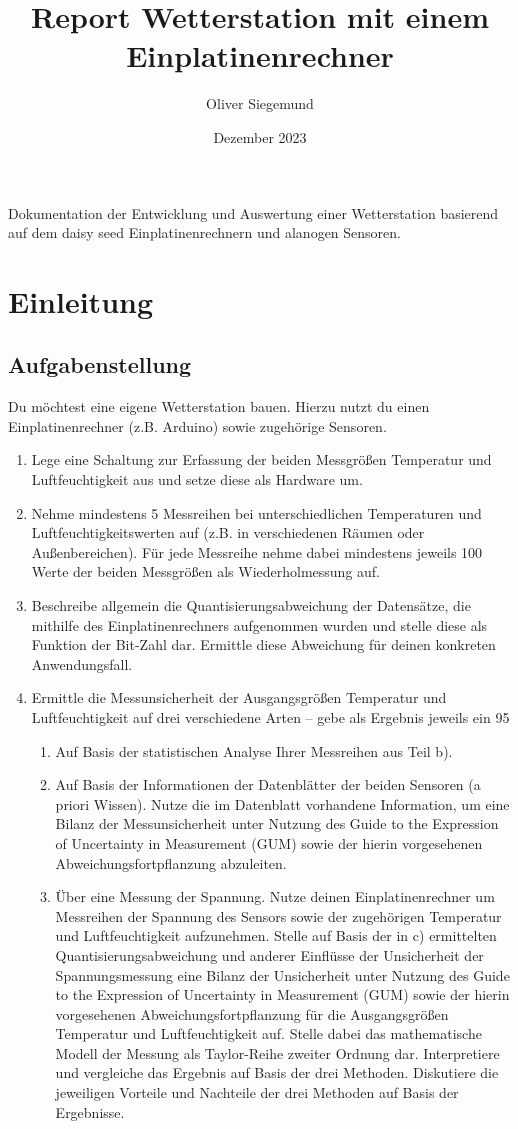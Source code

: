 \documentclass{report}
\title{Report Wetterstation mit einem Einplatinenrechner}
\author{Oliver Siegemund}
\date{Dezember 2023}
\begin{document}
\maketitle
Dokumentation der Entwicklung und Auswertung einer Wetterstation basierend auf dem daisy seed Einplatinenrechnern und alanogen Sensoren.
\pagebreak
\tableofcontents
\pagebreak
\chapter{Einleitung}
\section{Aufgabenstellung}
Du möchtest eine eigene Wetterstation bauen. Hierzu nutzt du einen Einplatinenrechner (z.B. Arduino) sowie zugehörige Sensoren.
\begin{enumerate}
	\item Lege eine Schaltung zur Erfassung der beiden Messgrößen Temperatur und Luftfeuchtigkeit aus und setze diese als Hardware um.
	\item Nehme mindestens 5 Messreihen bei unterschiedlichen Temperaturen und Luftfeuchtigkeitswerten auf (z.B. in verschiedenen Räumen oder Außenbereichen). Für jede Messreihe nehme dabei mindestens jeweils 100 Werte der beiden Messgrößen als Wiederholmessung auf.
	\item Beschreibe allgemein die Quantisierungsabweichung der Datensätze, die mithilfe des Einplatinenrechners aufgenommen wurden und stelle diese als Funktion der Bit-Zahl dar. Ermittle diese Abweichung für deinen konkreten Anwendungsfall.
	\item Ermittle die Messunsicherheit der Ausgangsgrößen Temperatur und Luftfeuchtigkeit auf drei verschiedene Arten – gebe als Ergebnis jeweils ein 95%
\begin{enumerate}
	\item Auf Basis der statistischen Analyse Ihrer Messreihen aus Teil b).
\item Auf Basis der Informationen der Datenblätter der beiden Sensoren (a priori Wissen). Nutze die im Datenblatt vorhandene Information, um eine Bilanz der Messunsicherheit unter Nutzung des Guide to the Expression of Uncertainty in Measurement (GUM) sowie der hierin vorgesehenen Abweichungsfortpflanzung abzuleiten.
\item Über eine Messung der Spannung. Nutze deinen Einplatinenrechner um Messreihen der Spannung des Sensors sowie der zugehörigen Temperatur und Luftfeuchtigkeit aufzunehmen. Stelle auf Basis der in c) ermittelten Quantisierungsabweichung und anderer Einflüsse der Unsicherheit der Spannungsmessung eine Bilanz der Unsicherheit unter Nutzung des Guide to the Expression of Uncertainty in Measurement (GUM) sowie der hierin vorgesehenen Abweichungsfortpflanzung für die Ausgangsgrößen Temperatur und Luftfeuchtigkeit auf. Stelle dabei das mathematische Modell der Messung als Taylor-Reihe zweiter Ordnung dar. Interpretiere und vergleiche das Ergebnis auf Basis der drei Methoden. Diskutiere die jeweiligen Vorteile und Nachteile der drei Methoden auf Basis der Ergebnisse.

\end{enumerate}
\end{enumerate}
\end{document}
